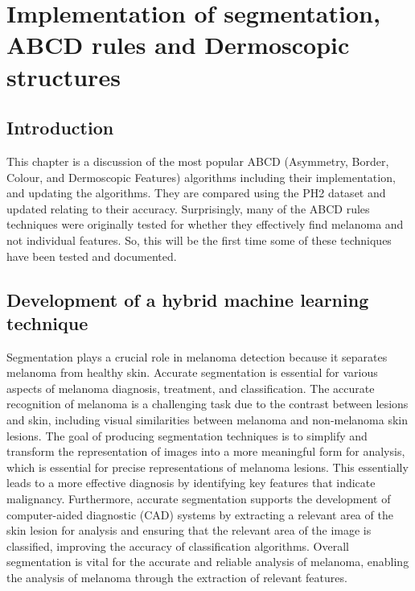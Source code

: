 
\chapter{Implementation of segmentation, ABCD rules  and Dermoscopic structures}

\section{Introduction}
This chapter is a discussion of the most popular ABCD (Asymmetry, Border, Colour, and Dermoscopic Features) algorithms including their implementation, and updating the algorithms. They are compared using the PH2 dataset and updated relating to their accuracy. Surprisingly, many of the ABCD rules techniques were originally tested for whether they effectively find melanoma and not individual features. So, this will be the first time some of these techniques have been tested and documented.

\section{Development of a hybrid machine learning technique}
Segmentation plays a crucial role in melanoma detection because it separates melanoma from healthy skin. Accurate segmentation is essential for various aspects of melanoma diagnosis, treatment, and classification\cite{Albahli2020}. The accurate recognition of melanoma is a challenging task due to the contrast between lesions and skin, including visual similarities between melanoma and non-melanoma skin lesions\cite{li2018}. The goal of producing segmentation techniques is to simplify and transform the representation of images into a more meaningful form for analysis, which is essential for precise representations of melanoma lesions\cite{Masood2013}. This essentially leads to a more effective diagnosis by identifying key features that indicate malignancy\cite{ali2023}. Furthermore, accurate segmentation supports the development of computer-aided diagnostic (CAD) systems by extracting a relevant area of the skin lesion for analysis and ensuring that the relevant area of the image is classified, improving the accuracy of classification algorithms\cite{bi2019}. Overall segmentation is vital for the accurate and reliable analysis of melanoma, enabling the analysis of melanoma through the extraction of relevant features.

